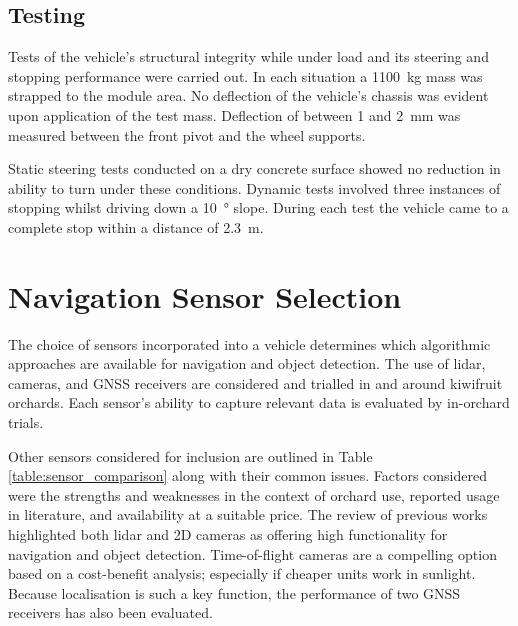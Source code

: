 \documentclass[preprint,authoryear,12pt]{elsarticle}
\begin{document}

    \subsection{Testing}
    \label{sub:drivability_tests}
        Tests of the vehicle's structural integrity while under load and its steering and stopping performance were carried out.
        In each situation a \SI{1100}{\kilo\gram} mass was strapped to the module area.
        No deflection of the vehicle's chassis was evident upon application of the test mass.
        Deflection of between 1 and \SI{2}{\milli\meter} was measured between the front pivot and the wheel supports.

        Static steering tests conducted on a dry concrete surface showed no reduction in ability to turn under these conditions.
        Dynamic tests involved three instances of stopping whilst driving down a \SI{10}{\degree} slope.
        During each test the vehicle came to a complete stop within a distance of \SI{2.3}{\meter}.


\section{Navigation Sensor Selection}
\label{sect:sensors}
    The choice of sensors incorporated into a vehicle determines which algorithmic approaches are available for navigation and object detection.
    The use of lidar, cameras, and GNSS receivers are considered and trialled in and around kiwifruit orchards.
    Each sensor's ability to capture relevant data is evaluated by in-orchard trials.

    Other sensors considered for inclusion are outlined in Table \ref{table:sensor_comparison} along with their common issues.
    Factors considered were the strengths and weaknesses in the context of orchard use, reported usage in literature, and availability at a suitable price.
    The review of previous works highlighted both lidar and 2D cameras as offering high functionality for navigation and object detection.
    Time-of-flight cameras are a compelling option based on a cost-benefit analysis; especially if cheaper units work in sunlight.
    Because localisation is such a key function, the performance of two GNSS receivers has also been evaluated.
\end{document}
